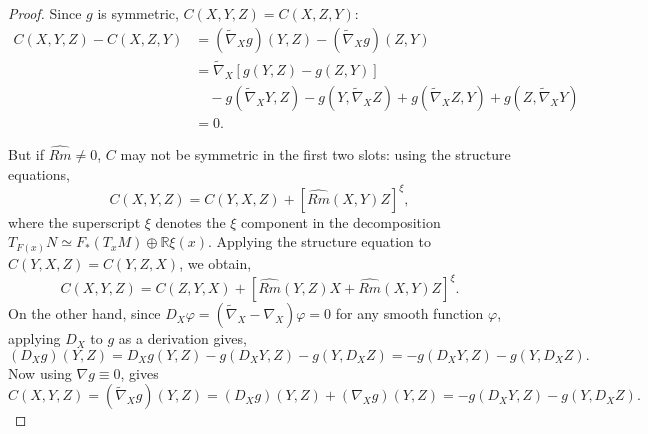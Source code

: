 \documentclass{amsart}
\theoremstyle{definition}
\theoremstyle{remark}
\numberwithin{equation}{section}
\begin{document}
\begin{proof}
Since $g$ is symmetric, $C(X, Y, Z) = C(X, Z, Y)$:
\[
\begin{split}
C(X, Y, Z) - C(X, Z, Y) &= (\tilde{\nabla}_X g) (Y, Z) - (\tilde{\nabla}_X g) (Z, Y) \\
&= \tilde{\nabla}_X \left[g(Y, Z) - g(Z, Y)\right] \\
&\quad - g(\tilde{\nabla}_X Y, Z) - g(Y, \tilde{\nabla}_X Z) + g(\tilde{\nabla}_X Z, Y) + g(Z, \tilde{\nabla}_X Y) \\
&= 0.
\end{split}
\]

But if $\widehat{Rm} \ne 0$, $C$ may not be symmetric in the first two slots: using the structure equations,
\[
C(X, Y, Z) = C(Y, X, Z) + [\widehat{Rm}(X, Y)Z]^{\xi},
\]
where the superscript $\xi$ denotes the $\xi$ component in the decomposition $T_{F(x)}N \simeq F_{\ast}(T_xM) \oplus \mathbb{R} \xi(x)$. Applying the structure equation to $C(Y, X, Z) = C(Y, Z, X)$, we obtain,
\begin{equation}
\label{eq:cubic_permutation1}
C(X, Y, Z) = C(Z, Y, X) + \left[\widehat{Rm}(Y, Z) X + \widehat{Rm}(X, Y) Z\right]^{\xi}.
\end{equation}
On the other hand, since $D_X \varphi = (\tilde{\nabla}_X - \nabla_X) \varphi = 0$ for any smooth function $\varphi$, applying $D_X$ to $g$ as a derivation gives,
\[
(D_X g) (Y, Z) = D_X g(Y, Z) -g(D_X Y, Z) - g(Y, D_X Z) = -g(D_X Y, Z) - g(Y, D_X Z).
\]
Now using $\nabla g \equiv 0$, gives
\begin{equation}
\label{eq:cubic_derivation_identity}
C(X, Y, Z) = (\tilde{\nabla}_X g) (Y, Z) = (D_X g) (Y, Z) + (\nabla_X g) (Y, Z) = -g(D_X Y, Z) - g(Y, D_X Z).
\end{equation}


\end{proof}
\end{document}
